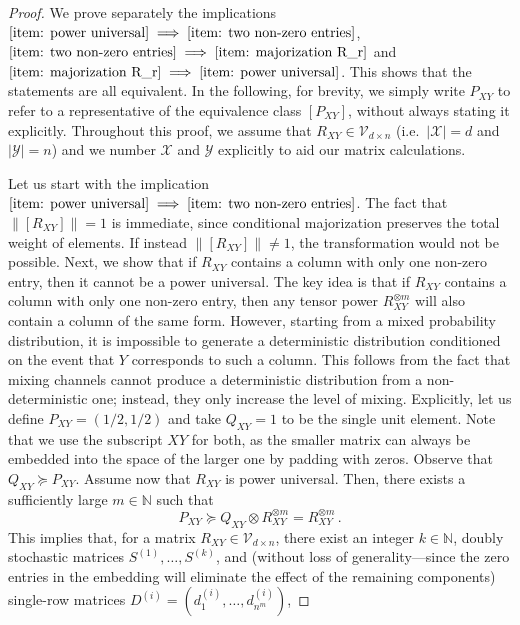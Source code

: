 \documentclass[aps,pra,11pt,onecolumn,nofootinbib,tightenlines]{revtex4-2}
\theoremstyle{definition}
\newcommand{\V}{\mathcal{V}}
\newcommand{\mc}[1]{\mathcal{#1}}
\begin{document}
\begin{proof}
We prove separately the implications $\ref{item: power universal} \implies \ref{item: two non-zero entries}$, $\ref{item: two non-zero entries} \implies \ref{item: majorization R_r}$ and $\ref{item: majorization R_r} \implies \ref{item: power universal}$. This shows that the statements are all equivalent.
In the following, for brevity, we simply write $P_{XY}$ to refer to a representative of the equivalence class $[P_{XY}]$, without always stating it explicitly. Throughout this proof, we assume that $R_{XY}\in\mc V_{d\times n}$ (i.e.\ $|\mc X|=d$ and $|\mc Y|=n$) and we number $\mc X$ and $\mc Y$ explicitly to aid our matrix calculations.

\bigskip

Let us start with the implication $\ref{item: power universal} \implies \ref{item: two non-zero entries}$. The fact that \( \|[R_{XY}]\| = 1 \) is immediate, since conditional majorization preserves the total weight of elements. If instead \( \|[R_{XY}]\| \neq 1 \), the transformation would not be possible. Next, we show that if $R_{XY}$ contains a column with only one non-zero entry, then it cannot be a power universal. The key idea is that if \( R_{XY} \) contains a column with only one non-zero entry, then any tensor power \( R_{XY}^{\otimes m} \) will also contain a column of the same form. However, starting from a mixed probability distribution, it is impossible to generate a deterministic distribution conditioned on the event that \( Y \) corresponds to such a column. This follows from the fact that mixing channels cannot produce a deterministic distribution from a non-deterministic one; instead, they only increase the level of mixing.
Explicitly, let us define \( P_{XY} = (1/2, 1/2) \) and take \( Q_{XY} = 1 \) to be the single unit element. Note that we use the subscript $XY$ for both, as the smaller matrix can always be embedded into the space of the larger one by padding with zeros.
Observe that \( Q_{XY} \succeq P_{XY} \).  Assume now that \( R_{XY} \) is power universal. Then, there exists a sufficiently large \( m \in \mathbb{N} \) such that
\begin{equation}
    P_{XY} \succeq Q_{XY} \otimes R_{XY}^{\otimes m} = R_{XY}^{\otimes m}\,.
\end{equation}
This implies that, for a matrix \( R_{XY} \in \V_{d \times n} \), there exist an integer \( k \in \mathbb{N} \), doubly stochastic matrices \( S^{(1)}, \ldots, S^{(k)}\), and (without loss of generality—since the zero entries in the embedding will eliminate the effect of the remaining components) single-row matrices \( D^{(i)} = (d^{(i)}_1, \ldots, d^{(i)}_{n^m}) \),

\end{proof}
\end{document}
